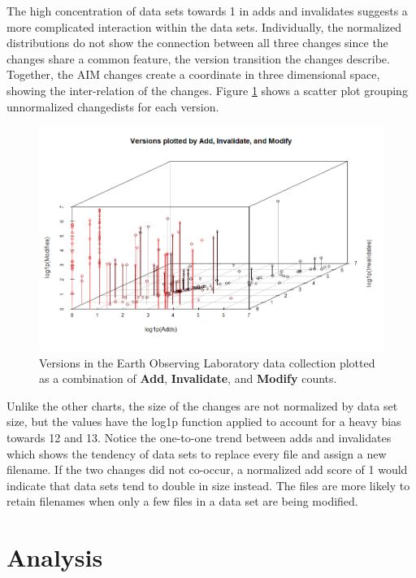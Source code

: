 The high concentration of data sets towards 1 in \glspl{add} and \glspl{invalidate} suggests a more complicated interaction within the data sets.
Individually, the normalized distributions do not show the connection between all three changes since the \glspl{change} share a common feature, the version transition the \glspl{change} describe.
Together, the \gls{AIM} \glspl{change} create a coordinate in three dimensional space, showing the inter-relation of the \glspl{change}. 
Figure \ref{EOL_AIM} shows a scatter plot grouping unnormalized \glspl{changedist} for each \gls{version}.
\begin{figure}%
	\centering
	\includegraphics[scale=.6]{figures/Eol_Versions_3d.png}
	\caption{Versions in the Earth Observing Laboratory data collection plotted as a combination of \textbf{Add}, \textbf{Invalidate}, and \textbf{Modify} counts.}
	\label{EOL_AIM}
\end{figure}
Unlike the other charts, the size of the changes are not normalized by data set size, but the values have the log1p function applied to account for a heavy bias towards 12 and 13.
Notice the one-to-one trend between \glspl{add} and \glspl{invalidate} which shows the tendency of data sets to replace every file and assign a new filename.
If the two \glspl{change} did not co-occur, a normalized \gls{add} score of 1 would indicate that data sets tend to double in size instead.
The files are more likely to retain filenames when only a few files in a data set are being modified.

\section{Analysis}

